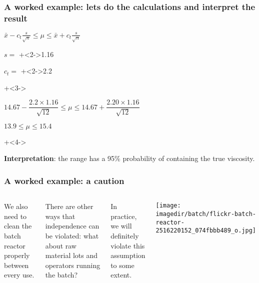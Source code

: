 \begin{frame}\frametitle{A worked example: lets do the calculations and interpret the result}
	\begin{itemize}
		\item	$\displaystyle \bar{x} - c_t\frac{s}{\sqrt{n}} \leq \mu \leq \bar{x} + c_t\frac{s}{\sqrt{n}}$
		\item	$s =$ \onslide+<2->{1.16}
		\item	$c_t =$ \onslide+<2->{2.2}
		
		\vspace{12pt}
		\onslide+<3->{
			\item	$14.67 - \dfrac{2.2 \times 1.16}{\sqrt{12}} \leq \mu \leq 14.67 + \dfrac{2.20 \times 1.16}{\sqrt{12}} $
			\item	$13.9 \leq \mu \leq 15.4$
		}
		\vspace{24pt}
		\onslide+<4->{
			\item	\textbf{Interpretation}: the range has a 95\% probability of containing the true viscosity.
		}
	\end{itemize}
\end{frame}

\begin{frame}\frametitle{A worked example: a caution}
	\begin{columns}[T]
			
			We also need to clean the batch reactor properly between every use. 
			
			\vspace{12pt}
			There are other ways that independence can be violated: what about raw material lots and operators running the batch?
			
			\vspace{12pt}
			In practice, we will definitely violate this assumption to some extent.
			\centerline{\texttt{[image: \\imagedir/batch/flickr-batch-reactor-2516220152\_074fbbb489\_o.jpg]} }
	\end{columns}
\end{frame}

